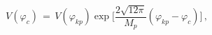 \begin{equation} \label{phic2}
V(\varphi_{c}) \, = \, V(\varphi_{kp}) \exp \Biggr[
\frac{2\sqrt{12\pi}}{M_{p}}(\varphi_{kp}-\varphi_{c})\Biggr] \, ,
\end{equation}


